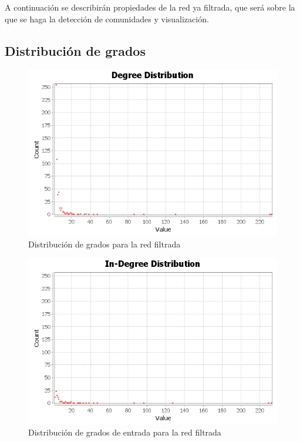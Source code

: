 A continuación se describirán propiedades de la red ya filtrada, que será sobre la que se haga la detección de comunidades y visualización.

\subsection{Distribución de grados}

\begin{figure}[H]
	\centering
	\includegraphics[width=12cm]{img/degree-distribution-filtered}
	\caption{Distribución de grados para la red filtrada}
	\label{fig:degree-distribution-filtered}
\end{figure}

\begin{figure}[H]
	\centering
	\includegraphics[width=12cm]{img/in-degree-distribution-filtered}
	\caption{Distribución de grados de entrada para la red filtrada}
	\label{fig:in-degree-distribution-filtered}
\end{figure}

